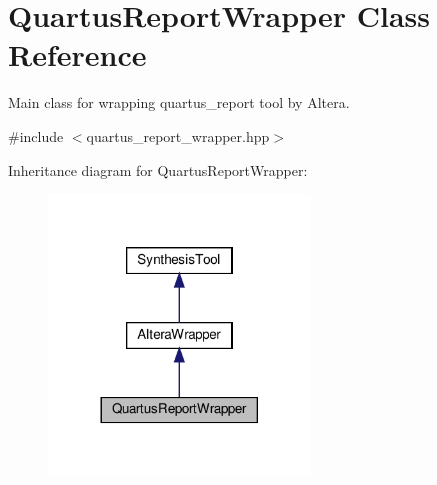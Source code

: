 \hypertarget{classQuartusReportWrapper}{}\section{Quartus\+Report\+Wrapper Class Reference}
\label{classQuartusReportWrapper}


Main class for wrapping quartus\+\_\+report tool by Altera.  




{\ttfamily \#include $<$quartus\+\_\+report\+\_\+wrapper.\+hpp$>$}



Inheritance diagram for Quartus\+Report\+Wrapper\+:
\nopagebreak
\begin{figure}[H]
\begin{center}
\leavevmode
\includegraphics[width=197pt]{d0/d80/classQuartusReportWrapper__inherit__graph}
\end{center}
\end{figure}


